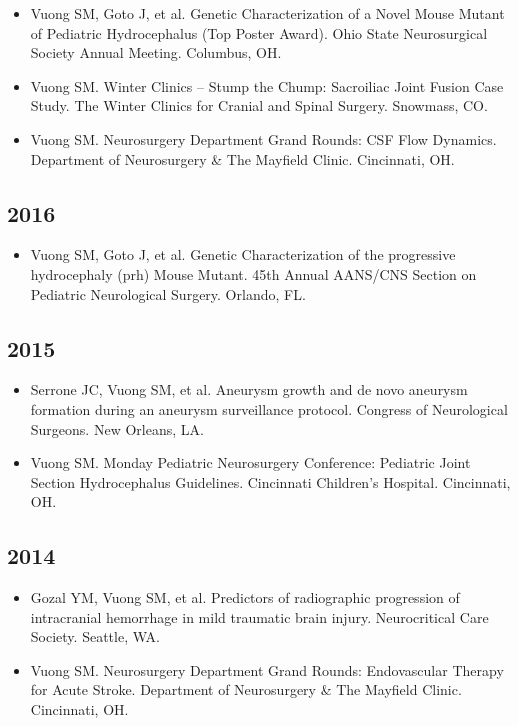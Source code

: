 \documentclass[11pt, a4paper]{article}
\begin{document}
\begin{itemize}
  \item Vuong SM, Goto J, et al. Genetic Characterization of a Novel Mouse Mutant of Pediatric Hydrocephalus (Top Poster Award). Ohio State Neurosurgical Society Annual Meeting. Columbus, OH.
  \item Vuong SM. Winter Clinics -- Stump the Chump: Sacroiliac Joint Fusion Case Study. The Winter Clinics for Cranial and Spinal Surgery. Snowmass, CO.
  \item Vuong SM. Neurosurgery Department Grand Rounds: CSF Flow Dynamics. Department of Neurosurgery \& The Mayfield Clinic. Cincinnati, OH.
\end{itemize}

\subsection{2016}
\begin{itemize}
  \setlength\itemindent{0.25em}
  \item Vuong SM, Goto J, et al. Genetic Characterization of the progressive hydrocephaly (prh) Mouse Mutant. 45th Annual AANS/CNS Section on Pediatric Neurological Surgery. Orlando, FL.
\end{itemize}

\subsection{2015}
\begin{itemize}
  \setlength\itemindent{0.25em}
  \item Serrone JC, Vuong SM, et al. Aneurysm growth and de novo aneurysm formation during an aneurysm surveillance protocol. Congress of Neurological Surgeons. New Orleans, LA.
  \item Vuong SM. Monday Pediatric Neurosurgery Conference: Pediatric Joint Section Hydrocephalus Guidelines. Cincinnati Children's Hospital. Cincinnati, OH.
\end{itemize}

\subsection{2014}
\begin{itemize}
  \setlength\itemindent{0.25em}
  \item Gozal YM, Vuong SM, et al. Predictors of radiographic progression of intracranial hemorrhage in mild traumatic brain injury. Neurocritical Care Society. Seattle, WA.
  \item Vuong SM. Neurosurgery Department Grand Rounds: Endovascular Therapy for Acute Stroke. Department of Neurosurgery \& The Mayfield Clinic. Cincinnati, OH.
\end{itemize}
\end{document}

